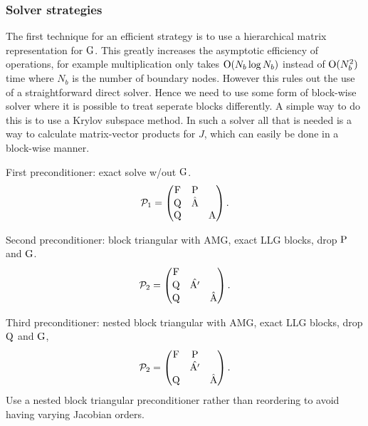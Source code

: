 \subsubsection{Solver strategies}
\label{sec:bem-solver-strategies}

The first technique for an efficient strategy is to use a hierarchical matrix representation for ${\mathbf{\mathrm{G}}}$.
This greatly increases the asymptotic efficiency of operations, for example multiplication only takes $\text{O}(N_b \log N_b)$ instead of $\text{O}(N_b^2)$ time where $N_b$ is the number of boundary nodes.
However this rules out the use of a straightforward direct solver.
Hence we need to use some form of block-wise solver where it is possible to treat seperate blocks differently.
A simple way to do this is to use a Krylov subspace method.
In such a solver all that is needed is a way to calculate matrix-vector products for $J$, which can easily be done in a block-wise manner.

\newcommand{\prcd}{\mathcal{P}}

First preconditioner: exact solve w/out ${\mathbf{\mathrm{G}}}$.
\begin{equation}
  \prcd_{1} = 
  \begin{pmatrix}
    \Fm       & \Pm     &  \\
    \Qm       & \hat{\Am}&   \\
    \Qm       &         &   \Am
  \end{pmatrix}.
\end{equation}

Second preconditioner: block triangular with AMG, exact LLG blocks, drop $\mathrm{P}$ and ${\mathbf{\mathrm{G}}}$.
\begin{equation}
  \prcd_{2} = 
  \begin{pmatrix}
    \Fm       &      &  \\
    \Qm       & \hat{\Am'}&   \\
    \Qm       &         &   \hat{\Am}
  \end{pmatrix}.
\end{equation}

Third preconditioner: nested block triangular with AMG, exact LLG blocks, drop $\mathrm{Q}$ and ${\mathbf{\mathrm{G}}}$,
\begin{equation}
  \prcd_{2} = 
  \begin{pmatrix}
    \Fm       & \Pm  &  \\
              & \hat{\Am'}&   \\
    \Qm       &         &   \hat{\Am}
  \end{pmatrix}.
\end{equation}
Use a nested block triangular preconditioner rather than reordering to avoid having varying Jacobian orders.

